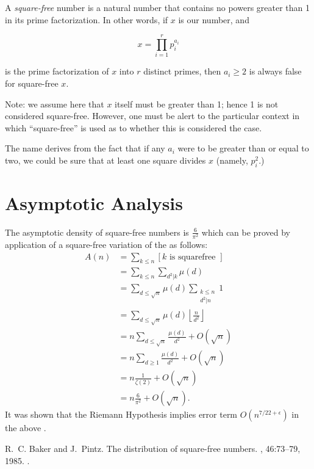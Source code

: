 \documentclass[12pt]{article}
\begin{document}

A \emph{square-free} number is a natural number that contains no powers greater than 1 in its prime factorization.  In other words, if $x$ is our number, and

$$ x = \prod_{i=1}^r p_i^{a_i} $$

is the prime factorization of $x$ into $r$ distinct primes, then $a_i \ge 2$ is
always false for square-free $x$.

Note: we assume here that $x$ itself must be greater than 1; hence 1 is not considered square-free.  However, one must be alert to the particular context in which ``square-free'' is used as to whether this is considered the case.

The name derives from the fact that if any $a_i$ were to be greater than or equal to two, we could be sure that at least one square divides $x$ (namely, $p_i^2$.)

\section{Asymptotic Analysis}

The asymptotic density of square-free numbers is $\frac{6}{\pi^2}$ which can be proved by application of a square-free variation of the  as follows:
\begin{align*}
A(n)&=\sum_{k\leq n} [k \text{ is squarefree }]\\
    &=\sum_{k\leq n} \sum_{d^2 | k} \mu(d)\\
    &=\sum_{d \leq \sqrt{n}} \mu(d) \sum_{\substack{k \leq n\\d^2 | n}} 1 \\
    &=\sum_{d \leq \sqrt{n}} \mu(d) \left\lfloor{\frac{n}{d^2}}\right\rfloor\\
    &=n \sum_{d \leq \sqrt{n}} \frac{\mu(d)}{d^2}+O(\sqrt{n})\\
    &=n \sum_{d\geq 1} \frac{\mu(d)}{d^2}+O(\sqrt{n})\\
    &=n \frac{1}{\zeta(2)} + O(\sqrt{n}) \\
    &=n \frac{6}{\pi^2}+O(\sqrt{n}).
\end{align*}
It was shown that the Riemann Hypothesis implies error term $O(n^{7/22+\epsilon})$ in the above \cite{cite:baker_pintz_sqfree}.

\begin{thebibliography}{1}

R.~C. Baker and J.~Pintz.
\newblock The distribution of square-free numbers.
, 46:73--79, 1985.
\newblock {}.

\end{thebibliography}
\end{document}
